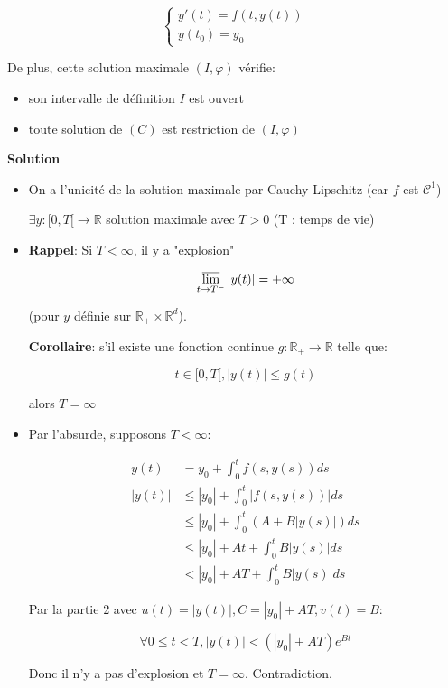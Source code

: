 \documentclass[10pt,a4paper,oneside]{article}
\newenvironment{exercice}[1][Exercice]{\begin{trivlist}
\item[\hskip \labelsep {\bfseries #1}]}{\end{trivlist}}
\begin{document}
\begin{exercice}{1}
\begin{enumerate}
\begin{itemize}
\[ \begin{cases}
y'(t) = f(t,y(t)) \\
y(t_0) = y_0
\end{cases} \]

De plus, cette solution maximale $(I,\varphi)$ vérifie:

\begin{itemize}
\item
son intervalle de définition $I$ est ouvert
\item
toute solution de $(C)$ est restriction de $(I,\varphi)$
\end{itemize}

\end{itemize}

\textbf{Solution}

\begin{itemize}
\item
On a l'unicité de la solution maximale par Cauchy-Lipschitz (car $f$ est $\mathcal{C}^1$)

$\exists y : [0,T[ \to \mathbb{R}$ solution maximale avec $T > 0$ (T : temps de vie)

\item
\textbf{Rappel}: Si $T < \infty$, il y a "explosion"

\[ \varlimsup_{t \to T^-} |y(t)| = +\infty \]

(pour $y$ définie sur $\mathbb{R_+} \times \mathbb{R}^d$).

\textbf{Corollaire}: s'il existe une fonction continue $g : \mathbb{R_+} \to \mathbb{R}$ telle que:

\[ t \in [0,T[ , |y(t)| \leq g(t) \]

alors $T = \infty$

\item
Par l'absurde, supposons $T < \infty$:

\begin{align*}
y(t) &= y_0 + \int_0^t f(s,y(s)) ds \\
|y(t)| &\leq |y_0| + \int_0^t |f(s,y(s))| ds \\
&\leq |y_0| + \int_0^t (A + B|y(s)|) ds \\
&\leq |y_0| + At + \int_0^t B|y(s)| ds \\
&< |y_0| + AT + \int_0^t B|y(s)| ds
\end{align*}

Par la partie 2 avec $u(t) = |y(t)|, C = |y_0| + AT, v(t) = B$:

\[ \forall 0 \leq t < T, |y(t)| < (|y_0| + AT)e^{Bt} \]

Donc il n'y a pas d'explosion et $T = \infty$. Contradiction.

\end{itemize}

\end{enumerate}

\end{exercice}
\end{document}
